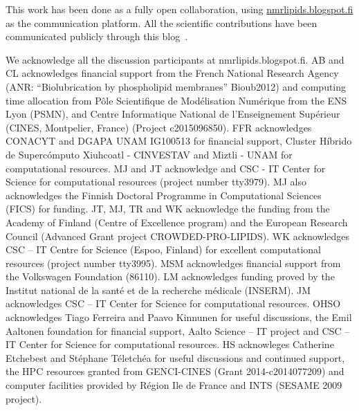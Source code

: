 \documentclass[journal=jacsat,manuscript=article]{achemso}
\begin{document}
This work has been done as a fully open collaboration, using \url{nmrlipids.blogspot.fi} as the communication
platform. All the scientific contributions have been communicated publicly through this blog~\cite{nmrlipids}.

\begin{acknowledgement}

We acknowledge all the discussion participants at nmrlipids.blogspot.fi.
AB and CL acknowledges financial support from the French National Research Agency
(ANR: “Biolubrication by phospholipid membranes” Bioub2012) and
computing time allocation from P{\^o}le Scientifique de Mod{\'e}lisation Num{\'e}rique from the ENS Lyon (PSMN),
and Centre Informatique National de l'Enseignement Sup{\'e}rieur (CINES, Montpelier, France)
(Project c2015096850).
FFR acknowledges CONACYT and DGAPA UNAM IG100513
for financial support, Cluster H\'ibrido de Superc\'omputo Xiuhcoatl - CINVESTAV and Miztli - UNAM for computational resources. 
MJ and JT acknowledge and CSC - IT Center for Science for computational resources (project number tty3979).
MJ also acknowledges the Finnish Doctoral Programme in Computational Sciences (FICS) for funding.
JT, MJ, TR and WK acknowledge the funding from the Academy of Finland (Centre of Excellence program) 
and the European Research Council (Advanced Grant project CROWDED-PRO-LIPIDS).
WK acknowledges CSC -- IT Centre for Science (Espoo, Finland) for excellent computational resources (project number tty3995).
MSM acknowledges financial support from the Volkswagen Foundation (86110).
LM acknowledges funding proved by the Institut national de la sant\'e et de la recherche m\'edicale (INSERM).
JM acknowledges CSC -- IT Center for Science for computational resources.
OHSO acknowledges Tiago Ferreira and Paavo Kinnunen for useful discussions, 
the Emil Aaltonen foundation for financial support, 
Aalto Science -- IT project and CSC -- IT Center for Science for computational resources. 
HS acknowleges Catherine Etchebest and St\'ephane T\'eletch\'ea for useful discussions and continued support, the HPC 
resources granted from GENCI-CINES (Grant 2014-c2014077209) and computer facilities provided by R\'egion Ile de France and INTS (SESAME 2009 project).

\end{acknowledgement}
\end{document}
